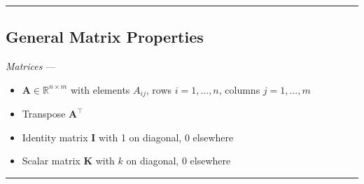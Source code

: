 {\color{black}\hrule height 0.001mm}

\subsection*{General Matrix Properties}
\emph{Matrices} ---
\begin{itemize}
    \item $\boldsymbol{A} \in \mathbb{R}^{n \times m}$ with elements $A_{ij}$, rows $i = 1,...,n$, columns $j = 1,...,m$
    \item Transpose $\boldsymbol{A^\intercal}$
    \item Identity matrix $\boldsymbol{I}$ with 1 on diagonal, 0 elsewhere
    \item Scalar matrix $\boldsymbol{K}$ with $k$ on diagonal, 0 elsewhere
\end{itemize}

{\color{lightgray}\hrule height 0.001mm}

